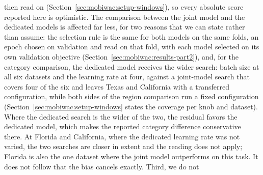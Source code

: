 then read on (Section~\ref{sec:mobiwac:setup-windows}), so every absolute score reported here is optimistic. The
comparison between the joint model and the dedicated models is affected far less, for two reasons that we can state
rather than assume: the selection rule is the same for both models on the same folds, an epoch chosen on validation and read
on that fold, with each model selected on its own validation objective (Section~\ref{sec:mobiwac:results-part2}),
and, for the category comparison, the dedicated model receives the wider search: batch size at all
six datasets and the learning rate at four, against a joint-model search that covers four of the six
and leaves Texas and California with a transferred configuration, while both sides of the region
comparison run a fixed configuration (Section~\ref{sec:mobiwac:setup-windows} states the coverage
per knob and dataset). Where the dedicated search is the wider of the two, the residual favors the
dedicated model, which makes the reported category difference conservative there. At Florida and
California, where the dedicated learning rate was not varied, the two searches are closer in extent
and the reading does not apply; Florida is also the one dataset where the joint model outperforms on
this task. It does not follow that the bias cancels exactly. Third, we do not
